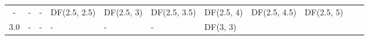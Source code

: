 \documentclass{article}
\begin{document}
\begin{longtable}[c]{@{}cllllllllll@{}}
\begin{minipage}[t]{0.13\columnwidth}
-
\strut\end{minipage} &
\begin{minipage}[t]{0.15\columnwidth}\raggedright\strut
-
\strut\end{minipage} &
\begin{minipage}[t]{0.13\columnwidth}\raggedright\strut
-
\strut\end{minipage} &
\begin{minipage}[t]{0.15\columnwidth}\raggedright\strut
DF(2.5, 2.5)
\strut\end{minipage} &
\begin{minipage}[t]{0.13\columnwidth}\raggedright\strut
DF(2.5, 3)
\strut\end{minipage} &
\begin{minipage}[t]{0.15\columnwidth}\raggedright\strut
DF(2.5, 3.5)
\strut\end{minipage} &
\begin{minipage}[t]{0.13\columnwidth}\raggedright\strut
DF(2.5, 4)
\strut\end{minipage} &
\begin{minipage}[t]{0.15\columnwidth}\raggedright\strut
DF(2.5, 4.5)
\strut\end{minipage} &
\begin{minipage}[t]{0.13\columnwidth}\raggedright\strut
DF(2.5, 5)
\strut\end{minipage}\tabularnewline
\begin{minipage}[t]{0.08\columnwidth}\centering\strut
3.0
\strut\end{minipage} &
\begin{minipage}[t]{0.15\columnwidth}\raggedright\strut
-
\strut\end{minipage} &
\begin{minipage}[t]{0.13\columnwidth}\raggedright\strut
-
\strut\end{minipage} &
\begin{minipage}[t]{0.15\columnwidth}\raggedright\strut
-
\strut\end{minipage} &
\begin{minipage}[t]{0.13\columnwidth}\raggedright\strut
-
\strut\end{minipage} &
\begin{minipage}[t]{0.15\columnwidth}\raggedright\strut
-
\strut\end{minipage} &
\begin{minipage}[t]{0.13\columnwidth}\raggedright\strut
DF(3, 3)
\strut\end{minipage} &
\begin{minipage}[t]{0.15\columnwidth}\raggedright\strut

\end{minipage}
\end{longtable}
\end{document}
